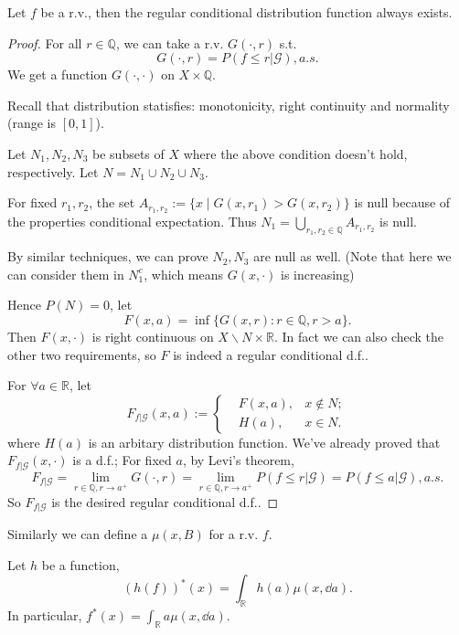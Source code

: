 \begin{theorem}
    Let $f$ be a r.v., then the regular conditional
	distribution function always exists.
\end{theorem}
\begin{proof}[Proof]
    For all $r\in \mathbb{Q}$, we can take a r.v. $G(\cdot, r)$ s.t.
	\[
	G(\cdot, r) = P(f\le r|\mathscr{G}), a.s.
	\]
	We get a function $G(\cdot, \cdot)$ on $X \times \mathbb{Q}$.

	Recall that distribution statisfies:
	monotonicity, right continuity and normality (range is $[0, 1]$).

	Let $N_1, N_2, N_3$ be subsets of $X$ where the above condition doesn't hold,
	respectively. Let $N = N_1\cup N_2\cup N_3$.

	For fixed $r_1, r_2$, the set $A_{r_1, r_2} := \{x\mid G(x, r_1)>G(x, r_2)\}$
	is null because of the properties conditional expectation.
	Thus $N_1 = \bigcup_{r_1, r_2\in \mathbb{Q}} A_{r_1, r_2}$ is null.

	By similar techniques, we can prove $N_2, N_3$ are null as well.
	(Note that here we can consider them in $N_1^c$, which means $G(x, \cdot)$
	is increasing)

	Hence $P(N) = 0$, let
	\[
	F(x, a) = \inf\{G(x, r): r\in \mathbb{Q}, r > a\}.
	\]
	Then $F(x, \cdot)$ is right continuous on $X \backslash N \times \mathbb{R}$.
	In fact we can also check the other two requirements,
	so $F$ is indeed a regular conditional d.f..

	For $\forall a\in \mathbb{R}$, let
	\[
	F_{f|\mathscr{G}}(x, a) := \left\{
	\begin{aligned}
		&F(x, a), &x\notin N;\\
		&H(a), &x\in N.
	\end{aligned}\right.
	\]
	where $H(a)$ is an arbitary distribution function.
	We've already proved that $F_{f|\mathscr{G}}(x, \cdot)$ is a d.f.;
	For fixed $a$, by Levi's theorem,
	\[
	F_{f|\mathscr{G}} = \lim_{r\in \mathbb{Q}, r\to a^+}G(\cdot, r)
	= \lim_{r\in \mathbb{Q}, r\to a^+} P(f\le r|\mathscr{G})
	= P(f\le a|\mathscr{G}), a.s.
	\]
	So $F_{f|\mathscr{G}}$ is the desired regular conditional d.f..
\end{proof}

Similarly we can define a  $\mu(x, B)$
for a r.v. $f$.
\begin{theorem}
    Let $h$ be a function,
	\[
		(h(f))^*(x) = \int_{\mathbb{R}} h(a)\mu(x, \dd a).
	\]
	In particular, $f^*(x) = \int_{\mathbb{R}} a\mu(x, \dd a)$.
\end{theorem}

